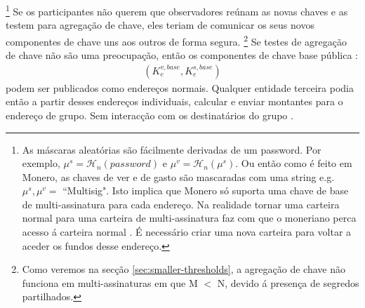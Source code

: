 \footnote{As máscaras aleatórias são fácilmente derivadas de um password. Por exemplo, $\mu^s = \mathcal{H}_n(password)$ e $\mu^v = \mathcal{H}_n(\mu^s)$. Ou então como é feito em Monero, as chaves de ver e de gasto são mascaradas com uma string  e.g. $\mu^s,\mu^v =$ ``Multisig". Isto implica que Monero só suporta uma chave de base de multi-assinatura para cada endereço. Na realidade tornar uma carteira normal para uma carteira de multi-assinatura faz com que o moneriano perca acesso á carteira normal \cite{cli-22multisig-instructions}. É necessário criar uma nova carteira para voltar a aceder os fundos desse endereço.}
Se os participantes não querem que observadores reúnam as novas chaves e as testem para agregação de chave, eles teriam de comunicar os seus novos componentes de chave uns aos outros de forma segura. 
\footnote{Como veremos na secção \ref{sec:smaller-thresholds}, a agregação de chave não funciona em multi-assinaturas em que M $<$ N, devido á presença de segredos partilhados.} 
Se testes de agregação de chave não são uma preocupação, então os componentes de chave base pública :
\begin{align*}
(K^{v,base}_e,K^{s,base}_e) 
\end{align*}
podem ser publicados como endereços normais. Qualquer entidade terceira podia então a partir desses endereços individuais, calcular e enviar montantes para o endereço de grupo. Sem interacção com os destinatários do grupo \cite{maxwell2018simple-musig}.

